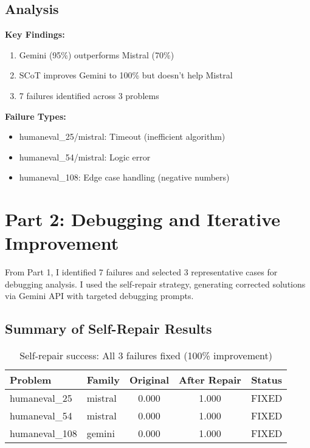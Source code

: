 \documentclass[11pt]{article}
\begin{document}
\subsection{Analysis}

\textbf{Key Findings:}
\begin{enumerate}
    \item Gemini (95\%) outperforms Mistral (70\%)
    \item SCoT improves Gemini to 100\% but doesn't help Mistral
    \item 7 failures identified across 3 problems
\end{enumerate}

\textbf{Failure Types:}
\begin{itemize}
    \item humaneval\_25/mistral: Timeout (inefficient algorithm)
    \item humaneval\_54/mistral: Logic error
    \item humaneval\_108: Edge case handling (negative numbers)
\end{itemize}

\newpage
\clearpage
\section{Part 2: Debugging and Iterative Improvement}

From Part 1, I identified 7 failures and selected 3 representative cases for debugging analysis. I used the self-repair strategy, generating corrected solutions via Gemini API with targeted debugging prompts.

\subsection{Summary of Self-Repair Results}

\begin{table}[h]
\centering
\begin{tabular}{llccc}
\toprule
\textbf{Problem} & \textbf{Family} & \textbf{Original} & \textbf{After Repair} & \textbf{Status} \\
\midrule
humaneval\_25 & mistral & 0.000 & 1.000 & FIXED \\
humaneval\_54 & mistral & 0.000 & 1.000 & FIXED \\
humaneval\_108 & gemini & 0.000 & 1.000 & FIXED \\
\bottomrule
\end{tabular}
\caption{Self-repair success: All 3 failures fixed (100\% improvement)}
\end{table}
\end{document}
